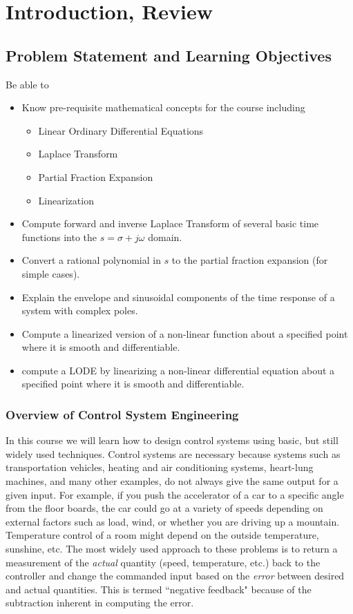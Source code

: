 %
%
%

\chapter{Introduction, Review}

\section{Problem Statement and Learning Objectives}

Be able to
\begin{itemize}
    \item Know pre-requisite mathematical concepts for the course including
    \begin{itemize}
        \item Linear Ordinary Differential Equations
        \item Laplace Transform
        \item Partial Fraction Expansion
        \item Linearization
    \end{itemize}
    \item Compute forward and inverse Laplace Transform of several basic time functions into the $s=\sigma+j\omega$ domain.
    \item Convert a rational polynomial in $s$ to the partial fraction expansion (for simple cases).
    \item Explain the envelope and sinusoidal components of the time response of a system with complex poles.
    \item Compute a linearized version of a non-linear function about a specified point where it is smooth and differentiable.
    \item compute a LODE by linearizing a non-linear differential equation about a specified point where it is smooth and differentiable.
\end{itemize}


\subsection{Overview of Control System Engineering}


In this course we will learn how to design control systems using basic, but still widely used techniques.
Control systems are necessary because systems such as transportation vehicles, heating and air conditioning systems,
heart-lung machines, and many other examples, do not always give the same output for a given input.  For example,
if you push the accelerator of a car to a specific angle from the floor boards, the car could go at a variety of speeds
depending on external factors such as load, wind, or whether you are driving up a mountain.   Temperature control of a room
might depend on the outside temperature, sunshine, etc.   The most widely used approach to these problems is to
return a measurement of the {\it actual } quantity (speed, temperature, etc.) back to the controller and change the
commanded input based on the {\it error} between desired and actual quantities.    This is termed ``negative feedback"
because of the subtraction inherent in computing the error.

